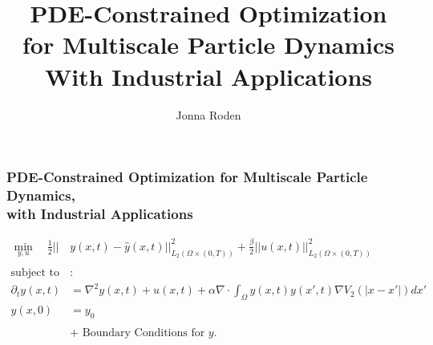 \documentclass[aspectratio=169,xcolor=dvipsnames]{beamer}
\newcommand{\Sta}{y}
\newcommand{\Con}{u}
\begin{document}
\title[]{{\huge PDE-Constrained Optimization \\for Multiscale Particle Dynamics} \\ With Industrial Applications}
\author[Jonna Roden (University of Edinburgh)]{Jonna Roden}
\date{}
\titlepage
 
 



\begin{frame}
\frametitle{PDE-Constrained Optimization \footnotesize{for Multiscale Particle Dynamics,\\ with Industrial Applications}}

\begin{align*}
\min_{\Sta,u} \quad \frac{1}{2}||&{\Sta(x,t)- \hat{\Sta}(x,t)}||_{L_2(\Omega \times (0,T))}^2 + \frac{\beta}{2} ||{\Con}(x,t)||_{L_2(\Omega \times (0,T))}^2\\
\\
\text{subject to} &\text{:}
\\
\partial_t \Sta(x,t) &=\nabla^2 \Sta(x,t) +\Con(x,t) + \alpha \nabla \cdot\int_\Omega \Sta(x,t) \Sta(x',t) \nabla V_2(|x-x'|)dx' \\
  \Sta(x,0)&=\Sta_0\\
  \\
  &+\text{ Boundary Conditions for $\Sta$.}
\end{align*}

\end{frame}
\end{document}
